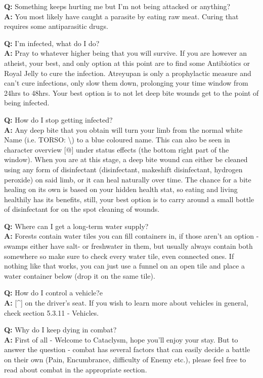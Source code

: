 \textbf{Q:} Something keeps hurting me but I'm not being attacked or anything?\\
\textbf{A:} You most likely have caught a parasite by eating raw meat. Curing that requires some antiparasitic drugs.

\textbf{Q:} I'm infected, what do I do?\\
\textbf{A:} Pray to whatever higher being that you will survive. If you are however an atheist, your best, and only option at this point are to find some Antibiotics or Royal Jelly to cure the infection. Atreyupan is only a prophylactic measure and can't cure infections, only slow them down, prolonging your time window from 24hrs to 48hrs. Your best option is to not let deep bite wounds get to the point of being infected.

\textbf{Q:} How do I stop getting infected?\\
\textbf{A:} Any deep bite that you obtain will turn your limb from the normal white Name (i.e. TORSO: \textbar\textbar\textbar\textbar\textbackslash) to a blue coloured name. This can also be seen in character overview [@] under status effects (the bottom right part of the window). When you are at this stage, a deep bite wound can either be cleaned using any form of disinfectant (disinfectant, makeshift disinfectant, hydrogen peroxide) on said limb, or it can heal naturally over time. The chance for a bite healing on its own is based on your hidden health stat, so eating and living healthily has its benefits, still, your best option is to carry around a small bottle of disinfectant for on the spot cleaning of wounds.

\textbf{Q:} Where can I get a long-term water supply?\\
\textbf{A:} Forests contain water tiles you can fill containers in, if those aren't an option - swamps either have salt- or freshwater in them, but usually always contain both somewhere so make sure to check every water tile, even connected ones. If nothing like that works, you can just use a funnel on an open tile and place a water container below (drop it on the same tile).

\textbf{Q:} How do I control a vehicle?e\\
\textbf{A:} [\^{}] on the driver's seat. If you wish to learn more about vehicles in general, check section 5.3.11 - Vehicles.

\textbf{Q:} Why do I keep dying in combat?\\
\textbf{A:} First of all - Welcome to Cataclysm, hope you'll enjoy your stay. But to answer the question - combat has several factors that can easily decide a battle on their own (Pain, Encumbrance, difficulty of Enemy etc.), please feel free to read about combat in the appropriate section.

